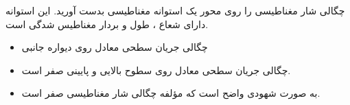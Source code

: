 \begin{ELexample}{}

چگالی شار مغناطیسی را روی محور یک استوانه مغناطیسی بدست آورید. این استوانه دارای شعاع ، طول  و بردار مغناطیس شدگی  است.


\begin{ELsolution}


\begin{itemize}
\tightlist
\item
  چگالی جریان سطحی معادل روی دیواره جانبی
\end{itemize}


\begin{itemize}
\tightlist
\item
  چگالی جریان سطحی معادل روی سطوح بالایی و پایینی صفر است.
\end{itemize}


\begin{itemize}
\tightlist
\item
  به صورت شهودی واضح است که مؤلفه  چگالی شار مغناطیسی صفر است.
\end{itemize}


\end{ELsolution}

\end{ELexample}

